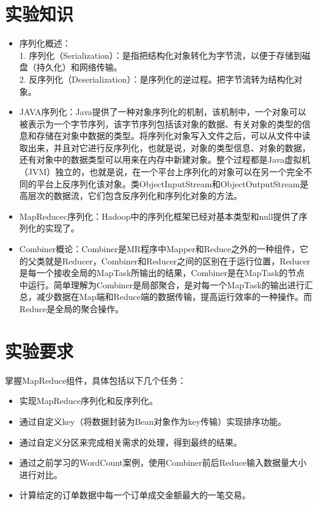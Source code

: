 \documentclass {article}
\begin{document}
	\section{实验知识}	
		\begin{itemize}
			\item 序列化概述：\\
			1. 序列化（Serialization）：是指把结构化对象转化为字节流，以便于存储到磁盘（持久化）和网络传输。\\
			2. 反序列化（Deserialization）：是序列化的逆过程。把字节流转为结构化对象。
			\item JAVA序列化：Java提供了一种对象序列化的机制，该机制中，一个对象可以被表示为一个字节序列，该字节序列包括该对象的数据、有关对象的类型的信息和存储在对象中数据的类型。将序列化对象写入文件之后，可以从文件中读取出来，并且对它进行反序列化，也就是说，对象的类型信息、对象的数据，还有对象中的数据类型可以用来在内存中新建对象。整个过程都是Java虚拟机（JVM）独立的，也就是说，在一个平台上序列化的对象可以在另一个完全不同的平台上反序列化该对象。类ObjectInputStream和ObjectOutputStream是高层次的数据流，它们包含反序列化和序列化对象的方法。
			\item MapReducec序列化：Hadoop中的序列化框架已经对基本类型和null提供了序列化的实现了。
			\item Combiner概论：Combiner是MR程序中Mapper和Reduce之外的一种组件，它的父类就是Reducer，Combiner和Reducer之间的区别在于运行位置，Reducer是每一个接收全局的MapTask所输出的结果，Combiner是在MapTask的节点中运行。简单理解为Combiner是局部聚合，是对每一个MapTask的输出进行汇总，减少数据在Map端和Reduce端的数据传输，提高运行效率的一种操作。而Reduce是全局的聚合操作。
		\end{itemize}
	
	\section{实验要求}
		掌握MapReduce组件，具体包括以下几个任务：
		\begin{itemize}
			\item 实现MapReduce序列化和反序列化。
			\item 通过自定义key（将数据封装为Bean对象作为key传输）实现排序功能。
			\item 通过自定义分区来完成相关需求的处理，得到最终的结果。
			\item 通过之前学习的WordCount案例，使用Combiner前后Reduce输入数据量大小进行对比。
			\item 计算给定的订单数据中每一个订单成交金额最大的一笔交易。
		\end{itemize}
	
\end{document}
